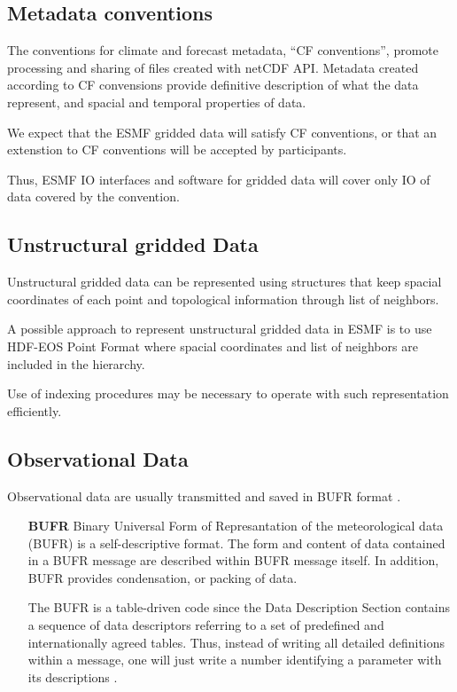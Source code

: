 \subsection{Metadata conventions} 

The conventions for climate and forecast metadata, ``CF conventions'',
\cite{NetCDF_CF_v1_beta3} promote processing and sharing of files
created with netCDF API. Metadata created according to CF convensions
provide definitive description of what the data represent, and spacial
and temporal properties of data.

We expect that the ESMF gridded data will satisfy CF conventions, or
that an extenstion to CF conventions will be accepted by participants.

Thus, ESMF IO interfaces and software for gridded data will cover only
IO of data covered by the convention.


\subsection{Unstructural gridded Data}

Unstructural gridded data can be represented using structures that
keep spacial coordinates of each point and topological information
through list of neighbors. 

A possible approach to represent unstructural gridded data in ESMF is
to use HDF-EOS Point Format \cite{HDF-EOS} where spacial coordinates
and list of neighbors are included in the hierarchy.

Use of indexing procedures may be necessary to operate with such
representation efficiently. 

\subsection{Observational Data}

Observational data are usually transmitted and saved in BUFR format 
\cite{WMO-BUFR-CREX}. 

\begin{itemize}
\item[\bf BUFR] Binary Universal Form of Represantation
of the meteorological data (BUFR) is a self-descriptive format. The
form and content of data contained in a BUFR message are described
within BUFR message itself. In addition, BUFR provides condensation,
or packing of data. 

The BUFR is a table-driven code since the Data Description Section
contains a sequence of data descriptors referring to a set of predefined and 
internationally agreed tables. Thus, instead of writing all detailed
definitions within a message, one will just write a number identifying
a parameter with its descriptions \cite{WMO-BUFR-CREX}.
\end{itemize}

